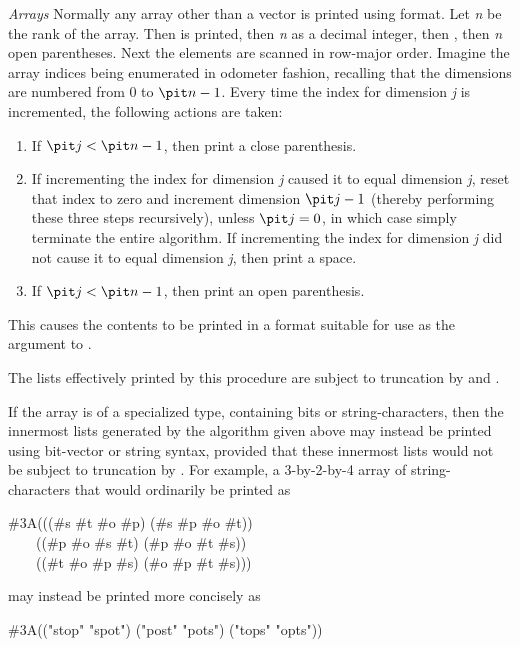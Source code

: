 \begin{flushdesc}
\item[{\it Arrays}]
Normally any array other than a vector is printed
using  format.  Let {\it n} be the rank of the array.
Then \cd{\#} is printed, then {\it n} as a decimal integer,
then , then {\it n} open parentheses.  Next the elements
are scanned in row-major order.  Imagine the array indices being
enumerated in odometer fashion, recalling that the dimensions
are numbered from 0 to ${\it n}-1$.  Every time the index for
dimension {\it j} is incremented, the following actions are taken:
\begin{enumerate}
\item
If ${\it j}<{\it n}-1$, then print a close parenthesis.

\item
If incrementing the index for dimension {\it j} caused it to equal
dimension {\it j}, reset that index to zero and increment dimension
${\it j}-1$ (thereby performing these three steps recursively),
unless ${\it j}=0$, in which case simply terminate the entire algorithm.
If incrementing the index for dimension {\it j} did not cause it to
equal dimension {\it j}, then print a space.

\item
If ${\it j}<{\it n}-1$, then print an open parenthesis.
\end{enumerate}
This causes the contents to be printed in a format suitable for
use as the  argument to .
\begin{obsolete}
The lists effectively printed by this procedure are subject to
truncation by  and .
\end{obsolete}

If the array is of a specialized type, containing bits or string-characters,
then the innermost lists generated by the algorithm given above may instead
be printed using bit-vector or string syntax, provided that these innermost
lists would not be subject to truncation by .  For example,
a 3-by-2-by-4 array of string-characters that would ordinarily be printed as
\begin{lisp}
\#3A(((\#{\Xbackslash}s \#{\Xbackslash}t \#{\Xbackslash}o \#{\Xbackslash}p) (\#{\Xbackslash}s \#{\Xbackslash}p \#{\Xbackslash}o \#{\Xbackslash}t)) \\
~~~~((\#{\Xbackslash}p \#{\Xbackslash}o \#{\Xbackslash}s \#{\Xbackslash}t) (\#{\Xbackslash}p \#{\Xbackslash}o \#{\Xbackslash}t \#{\Xbackslash}s)) \\
~~~~((\#{\Xbackslash}t \#{\Xbackslash}o \#{\Xbackslash}p \#{\Xbackslash}s) (\#{\Xbackslash}o \#{\Xbackslash}p \#{\Xbackslash}t \#{\Xbackslash}s)))
\end{lisp}
may instead be printed more concisely as
\begin{lisp}
\#3A(("stop" "spot") ("post" "pots") ("tops" "opts"))
\end{lisp}


\end{flushdesc}
